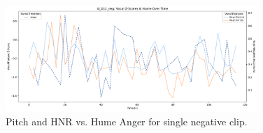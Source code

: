

\begin{figure}[H]
    \centering
    \includegraphics[width=0.85\textwidth]{png/results/rq3_2/combined_zscore_hume_id_012_neg_6.pdf} 
    \caption{Pitch and HNR vs. Hume Anger for single negative clip.}
    \label{fig:006_pos-surp-sadn}
\end{figure}
    



